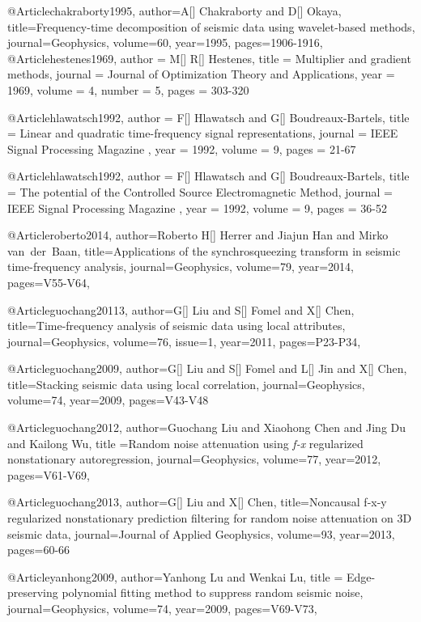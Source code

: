 @Article{chakraborty1995,
author={A[] Chakraborty and D[] Okaya},
title={Frequency-time decomposition of
seismic data using wavelet-based methods},
journal={Geophysics},
volume=60,
year=1995,
pages={1906-1916},
}
@Article{hestenes1969,
  author = 	 {M[] R[] Hestenes},
  title = 	 {Multiplier and gradient methods},
  journal = 	 {Journal of Optimization Theory and Applications},
  year = 	 1969,
  volume = 	 4,
  number = 5,
  pages = 	 {303-320}
}

@Article{hlawatsch1992,
  author = 	 {F[] Hlawatsch and G[] Boudreaux-Bartels},
  title = 	 { Linear and quadratic time-frequency signal representations},
  journal = 	 { IEEE Signal Processing Magazine },
  year = 	 1992,
  volume = 	 9,
  pages = 	 {21-67}
}

@Article{hlawatsch1992,
  author = 	 {F[] Hlawatsch and G[] Boudreaux-Bartels},
  title = 	 {The potential of the Controlled Source Electromagnetic Method},
  journal = 	 { IEEE Signal Processing Magazine },
  year = 	 1992,
  volume = 	 9,
  pages = 	 {36-52}
}

@Article{roberto2014,
author={Roberto H[] Herrer and Jiajun Han and Mirko van~der~Baan},
title={Applications of the synchrosqueezing transform
in seismic time-frequency analysis},
journal={Geophysics},
volume=79,
year=2014,
pages={V55-V64},
}

@Article{guochang20113,
author={G[] Liu and S[] Fomel and X[] Chen},
title={Time-frequency analysis of seismic data using local attributes},
journal={Geophysics},
volume=76,
issue=1,
year=2011,
pages={P23-P34},
}


@Article{guochang2009,
author={G[] Liu and S[] Fomel and L[] Jin and X[] Chen},
title={Stacking seismic data using local correlation},
journal={Geophysics},
volume=74,
year=2009,
pages={V43-V48}
}

@Article{guochang2012,
  author={Guochang Liu and Xiaohong Chen and Jing Du and Kailong Wu},
  title ={Random noise attenuation using \emph{f-x} regularized nonstationary autoregression},
  journal={Geophysics},
  volume=77,
  year=2012,
  pages={V61-V69},
}

@Article{guochang2013,
author={G[] Liu and X[] Chen},
title={Noncausal f-x-y regularized nonstationary prediction filtering for random noise attenuation on 3{D} seismic data},
journal={Journal of Applied Geophysics},
volume=93,
year=2013,
pages={60-66}
}

@Article{yanhong2009,
  author={Yanhong Lu and Wenkai Lu},
  title ={ Edge-preserving polynomial fitting method to suppress random seismic noise},
  journal={Geophysics},
  volume=74,
  year=2009,
  pages={V69-V73},
}

